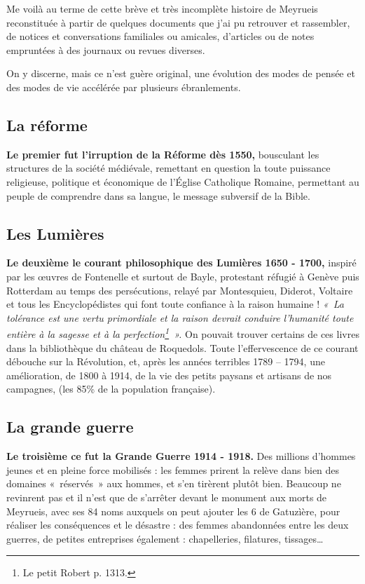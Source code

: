 
Me voilà au terme de cette brève et très incomplète histoire de Meyrueis reconstituée à partir
de quelques documents que j’ai pu retrouver et rassembler, de notices et conversations
familiales ou amicales, d’articles ou de notes empruntées à des journaux ou revues diverses.

On y discerne, mais ce n’est guère original, une évolution des modes de pensée et des modes
de vie accélérée par plusieurs ébranlements.

\subsection{La réforme}

\textbf{Le premier fut l’irruption de la Réforme dès 1550,}
bousculant les structures de la société médiévale, remettant en question la toute puissance
religieuse, politique et économique de l’Église Catholique Romaine, permettant au peuple de
comprendre dans sa langue, le message subversif de la Bible.

\subsection{Les Lumières}

\textbf{Le deuxième le courant philosophique des Lumières 1650 - 1700,}
inspiré par les œuvres de Fontenelle et surtout de Bayle, protestant réfugié à Genève puis
Rotterdam au temps des persécutions, relayé par Montesquieu, Diderot, Voltaire et tous les
Encyclopédistes qui font toute confiance à la raison humaine ! \emph{«~La tolérance est une vertu
primordiale et la raison devrait conduire l’humanité toute entière à la sagesse et à la perfection\footnote{Le petit Robert p. 1313.}~».} On pouvait trouver certains de ces livres dans la bibliothèque du château de Roquedols.
Toute l’effervescence de ce courant débouche sur la Révolution, et, après les années terribles
1789 -- 1794, une amélioration, de 1800 à 1914, de la vie des petits paysans et artisans de nos
campagnes, (les 85\% de la population française).

\subsection{La grande guerre}

\textbf{Le troisième ce fut la Grande Guerre 1914 - 1918.}
Des millions d’hommes jeunes et en pleine force mobilisés : les femmes prirent la relève dans
bien des domaines «~réservés~» aux hommes, et s’en tirèrent plutôt bien. Beaucoup ne
revinrent pas et il n’est que de s’arrêter devant le monument aux morts de Meyrueis, avec ses
84 noms auxquels on peut ajouter les 6 de Gatuzìère, pour réaliser les conséquences et le
désastre : des femmes abandonnées entre les deux guerres, de petites entreprises également :
chapelleries, filatures, tissages…

